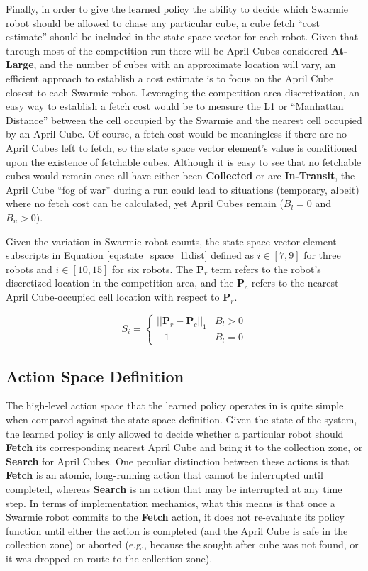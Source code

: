 \documentclass[sigconf,authordraft]{acmart}
\begin{document}
Finally, in order to give the learned policy the ability to decide which Swarmie robot should be allowed to chase any particular cube, a cube fetch ``cost estimate'' should be included in the state space vector for each robot. Given that through most of the competition run there will be April Cubes considered \textbf{At-Large}, and the number of cubes with an approximate location will vary, an efficient approach to establish a cost estimate is to focus on the April Cube closest to each Swarmie robot. Leveraging the competition area discretization, an easy way to establish a fetch cost would be to measure the L1 or ``Manhattan Distance'' between the cell occupied by the Swarmie and the nearest cell occupied by an April Cube. Of course, a fetch cost would be meaningless if there are no April Cubes left to fetch, so the state space vector element's value is conditioned upon the existence of fetchable cubes. Although it is easy to see that no fetchable cubes would remain once all have either been \textbf{Collected} or are \textbf{In-Transit}, the April Cube ``fog of war'' during a run could lead to situations (temporary, albeit) where no fetch cost can be calculated, yet April Cubes remain ($B_l = 0$ and $B_u > 0$).

Given the variation in Swarmie robot counts, the state space vector element subscripts in Equation \ref{eq:state_space_l1dist} defined as $i \in [7,9]$ for three robots and $i \in [10,15]$ for six robots. The $\textbf{P}_r$ term refers to the robot's discretized location in the competition area, and the $\textbf{P}_c$ refers to the nearest April Cube-occupied cell location with respect to $\textbf{P}_r$.

\begin{equation}\label{eq:state_space_l1dist}
  S_i =
    \begin{cases}
      ||\textbf{P}_r - \textbf{P}_c||_1 & B_l > 0 \\
      -1 & B_l = 0
    \end{cases}
\end{equation}

\subsection{Action Space Definition}\label{subsec:action_space}
The high-level action space that the learned policy operates in is quite simple when compared against the state space definition. Given the state of the system, the learned policy is only allowed to decide whether a particular robot should \textbf{Fetch} its corresponding nearest April Cube and bring it to the collection zone, or \textbf{Search} for April Cubes. One peculiar distinction between these actions is that \textbf{Fetch} is an atomic, long-running action that cannot be interrupted until completed, whereas \textbf{Search} is an action that may be interrupted at any time step. In terms of implementation mechanics, what this means is that once a Swarmie robot commits to the \textbf{Fetch} action, it does not re-evaluate its policy function until either the action is completed (and the April Cube is safe in the collection zone) or aborted (e.g., because the sought after cube was not found, or it was dropped en-route to the collection zone).
\end{document}
